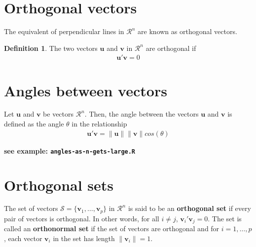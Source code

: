 \documentclass[
]{book}
\theoremstyle{definition}
\newtheorem{definition}{Definition}[chapter]
\theoremstyle{definition}
\theoremstyle{definition}
\theoremstyle{definition}
\theoremstyle{remark}
\begin{document}
\hypertarget{orthogonal-vectors}{%
\section{Orthogonal vectors}\label{orthogonal-vectors}}

The equivalent of perpendicular lines in \(\mathcal{R}^n\) are known as orthogonal vectors.

\begin{definition}
The two vectors \(\mathbf{u}\) and \(\mathbf{v}\) in \(\mathcal{R}^n\) are orthogonal if
\[
\begin{aligned}
\mathbf{u}' \mathbf{v} = 0
\end{aligned}
\]
\end{definition}

\hypertarget{angles-between-vectors}{%
\section{Angles between vectors}\label{angles-between-vectors}}

Let \(\mathbf{u}\) and \(\mathbf{v}\) be vectors \(\mathcal{R}^n\). Then, the angle between the vectors \(\mathbf{u}\) and \(\mathbf{v}\) is defined as the angle \(\theta\) in the relationship
\[
\begin{aligned}
\mathbf{u}' \mathbf{v} = \| \mathbf{u} \| \| \mathbf{v} \| cos(\theta)
\end{aligned}
\]

\textbf{see example: \texttt{angles-as-n-gets-large.R}}

\hypertarget{orthogonal-sets}{%
\section{Orthogonal sets}\label{orthogonal-sets}}

The set of vectors \(\mathcal{S} = \{ \mathbf{v}_1, \ldots, \mathbf{v}_p \}\) in \(\mathcal{R}^n\) is said to be an \textbf{orthogonal set} if every pair of vectors is orthogonal. In other words, for all \(i \neq j\), \(\mathbf{v}_i' \mathbf{v}_j = 0\). The set is called an \textbf{orthonormal set} if the set of vectors are orthogonal and for \(i = 1, \ldots, p\), each vector \(\mathbf{v}_i\) in the set has length \(\| \mathbf{v}_i \| = 1\).
\end{document}

